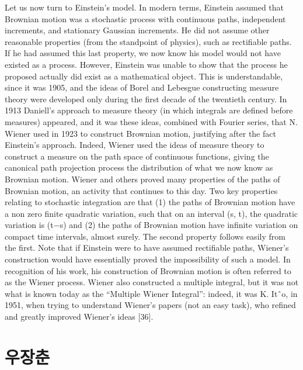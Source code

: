 \documentclass[]{tufte-handout}
\begin{document}
Let us now turn to Einstein's model. In modern terms, Einstein assumed
that Brownian motion was a stochastic process with continuous paths,
independent increments, and stationary Gaussian increments. He did not
assume other reasonable properties (from the standpoint of physics),
such as rectifiable paths. If he had assumed this last property, we now
know his model would not have existed as a process. However, Einstein
was unable to show that the process he proposed actually did exist as a
mathematical object. This is understandable, since it was 1905, and the
ideas of Borel and Lebesgue constructing measure theory were developed
only during the first decade of the twentieth century. In 1913 Daniell's
approach to measure theory (in which integrals are defined before
measures) appeared, and it was these ideas, combined with Fourier
series, that N. Wiener used in 1923 to construct Brownian motion,
justifying after the fact Einstein's approach. Indeed, Wiener used the
ideas of measure theory to construct a measure on the path space of
continuous functions, giving the canonical path projection process the
distribution of what we now know as Brownian motion. Wiener and others
proved many properties of the paths of Brownian motion, an activity that
continues to this day. Two key properties relating to stochastic
integration are that (1) the paths of Brownian motion have a non zero
finite quadratic variation, such that on an interval (s, t), the
quadratic variation is (t−s) and (2) the paths of Brownian motion have
infinite variation on compact time intervals, almost surely. The second
property follows easily from the first. Note that if Einstein were to
have assumed rectifiable paths, Wiener's construction would have
essentially proved the impossibility of such a model. In recognition of
his work, his construction of Brownian motion is often referred to as
the Wiener process. Wiener also constructed a multiple integral, but it
was not what is known today as the ``Multiple Wiener Integral'': indeed,
it was K. Itˆo, in 1951, when trying to understand Wiener's papers (not
an easy task), who refined and greatly improved Wiener's ideas {[}36{]}.

\hypertarget{uxc6b0uxc7a5uxcd98}{%
\section{우장춘}\label{uxc6b0uxc7a5uxcd98}}
\end{document}
